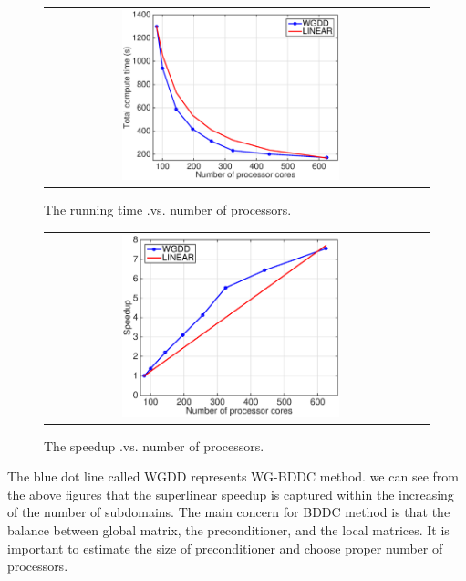				\begin{figure}[h]
					\centering
					\begin{tabular}{cc}
						\includegraphics[width=0.6\textwidth]{./pics/p1time.eps} 
					\end{tabular}
					\caption{\footnotesize The running time .vs. number of processors.}\label{fig6: time}
				\end{figure}
				
				
					\begin{figure}[h]
						\centering
						\begin{tabular}{cc}
							 \includegraphics[width=0.6\textwidth]{./pics/p1speed.eps}
						\end{tabular}
						\caption{\footnotesize The speedup .vs. number of processors.}\label{fig6: time}
					\end{figure}
				
				The blue dot line called WGDD represents WG-BDDC method. we can see from the above figures that the superlinear speedup is captured within the increasing of the number of subdomains. The main concern for BDDC method is that the balance between global matrix, the preconditioner, and the local matrices. It is important to estimate the size of preconditioner and choose proper number of processors.
				
